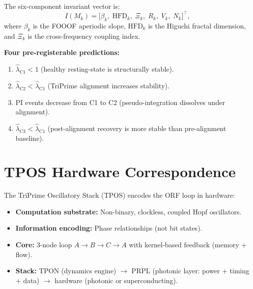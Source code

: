 \documentclass[12pt,a4paper]{article}
\theoremstyle{plain}
\theoremstyle{definition}
\newcommand{\hatlambda}{\hat{\lambda}}
\begin{document}
\noindent The six-component invariant vector is:
\begin{equation}
  I(M_k) = \bigl[\beta_k,\; \mathrm{HFD}_k,\; \Xi_k,\; R_k,\; V_k,\; N_k\bigr]^\top,
  \label{eq:invariant}
\end{equation}
where $\beta_k$ is the FOOOF aperiodic slope, $\mathrm{HFD}_k$ is the Higuchi fractal
dimension, and $\Xi_k$ is the cross-frequency coupling index.

\noindent \textbf{Four pre-registerable predictions:}
\begin{enumerate}[label=\textbf{P\arabic*.}]
  \item $\hatlambda_{\mathrm{C1}} < 1$ (healthy resting-state is structurally stable).
  \item $\hatlambda_{\mathrm{C2}} < \hatlambda_{\mathrm{C1}}$ (TriPrime alignment increases stability).
  \item PI events decrease from C1 to C2 (pseudo-integration dissolves under alignment).
  \item $\hatlambda_{\mathrm{C3}} < \hatlambda_{\mathrm{C1}}$ (post-alignment recovery is more stable than pre-alignment baseline).
\end{enumerate}

\section{TPOS Hardware Correspondence}
\label{sec:tpos}

The TriPrime Oscillatory Stack (TPOS) encodes the ORF loop in hardware:

\begin{itemize}
  \item \textbf{Computation substrate:} Non-binary, clockless, coupled Hopf oscillators.
  \item \textbf{Information encoding:} Phase relationships (not bit states).
  \item \textbf{Core:} 3-node loop $A \to B \to C \to A$ with kernel-based feedback
        (memory + flow).
  \item \textbf{Stack:} TPON (dynamics engine) $\to$ PRPL (photonic layer: power +
        timing + data) $\to$ hardware (photonic or superconducting).
\end{itemize}
\end{document}
